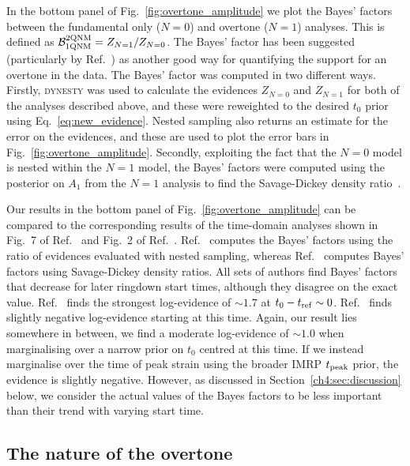 In the bottom panel of Fig.~\ref{fig:overtone_amplitude} we plot the Bayes' factors between the fundamental only ($N=0$) and overtone ($N=1$) analyses.
This is defined as $\mathcal{B}_{\rm 1QNM}^{\rm 2QNM}=Z_{N=1}/Z_{N=0}$.
The Bayes' factor has been suggested (particularly by Ref.~\cite{Cotesta:2022pci}) as another good way for quantifying the support for an overtone in the data.
The Bayes' factor was computed in two different ways.
Firstly, \textsc{dynesty} was used to calculate the evidences $Z_{N=0}$ and $Z_{N=1}$ for both of the analyses described above, and these were reweighted to the desired $t_0$ prior using Eq.~\ref{eq:new_evidence}. 
Nested sampling also returns an estimate for the error on the evidences, and these are used to plot the error bars in Fig.~\ref{fig:overtone_amplitude}.
Secondly, exploiting the fact that the $N=0$ model is nested within the $N=1$ model, the Bayes' factors were computed using the posterior on $A_1$ from the $N=1$ analysis to find the Savage-Dickey density ratio~\cite{10.2307/2958475}. 

Our results in the bottom panel of Fig.~\ref{fig:overtone_amplitude} can be compared to the corresponding results of the time-domain analyses shown in Fig.~7 of Ref.~\cite{Isi:2022mhy} and Fig.~2 of Ref.~\cite{Cotesta:2022pci}.
Ref.~\cite{Cotesta:2022pci} computes the Bayes' factors using the ratio of evidences evaluated with nested sampling, whereas Ref.~\cite{Isi:2022mhy} computes Bayes' factors using Savage-Dickey density ratios.
All sets of authors find Bayes' factors that decrease for later ringdown start times, although they disagree on the exact value.
Ref.~\cite{Isi:2022mhy} finds the strongest log-evidence of $\sim 1.7$ at $t_0-t_{\rm ref} \sim 0$.
Ref.~\cite{Cotesta:2022pci} finds slightly negative log-evidence starting at this time.
Again, our result lies somewhere in between, we find a moderate log-evidence of $\sim 1.0$ when marginalising over a narrow prior on $t_0$ centred at this time.
If we instead marginalise over the time of peak strain using the broader IMRP $t_{\rm peak}$ prior, the evidence is slightly negative.
However, as discussed in Section~\ref{ch4:sec:discussion} below, we consider the actual values of the Bayes factors to be less important than their trend with varying start time.


\subsection{The nature of the overtone}\label{subsec:verify}

